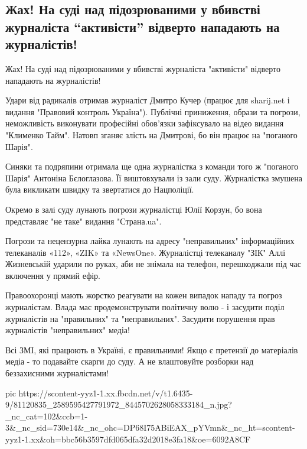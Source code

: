  
 
 
 
 
\subsection{Жах! На суді над підозрюваними у вбивстві журналіста  \enquote{активісти} відверто нападають на журналістів! }
\label{sec:24_12_2019.fb.tomilenko_sergij.1.aktivist_napadenie_sud}

Жах! На суді над підозрюваними у вбивстві журналіста  "активісти" відверто нападають на журналістів! 

Удари від радикалів отримав журналіст Дмитро Кучер (працює для sharij.net і
видання "Правовий контроль Україна"). Публічні приниження, образи та погрози,
неможливість виконувати професійні обов'язки зафіксувало на відео  видання
"Клименко Тайм". Натовп зганяє злість на Дмитрові, бо він працює на "поганого
Шарія".

Синяки та подряпини отримала ще одна журналістка з команди того ж "поганого
Шарія" Антоніна Бєлоглазова. Її виштовхували із зали суду. Журналістка змушена
була викликати швидку та звертатися до Нацполіції.

Окремо в залі суду лунають погрози журналістці Юлії Корзун, бо вона представляє
"не таке" видання "Страна.ua".

Погрози та нецензурна лайка лунають на адресу "неправильних" інформаційних
телеканалів «112», «ZIK» та «NewsOne». Журналістці телеканалу "ЗІК" Аллі
Жизневській ударили по руках, аби не знімала на телефон, перешкоджали під час
включення у прямий ефір.

Правоохоронці мають жорстко реагувати на кожен випадок нападу та погроз
журналістам. Влада має продемонструвати політичну волю - і засудити поділ
журналістів на "правильних" та "неправильних". Засудити порушення прав
журналістів "неправильних" медіа!

Всі ЗМІ, які працюють в Україні, є правильними! Якщо є претензії до матеріалів
медіа - то подавайте скарги до суду. А не влаштовуйте розборки над беззахисними
журналістами!

\ifcmt
  pic https://scontent-yyz1-1.xx.fbcdn.net/v/t1.6435-9/81120835_2589595427791972_8445702628058333184_n.jpg?_nc_cat=102&ccb=1-3&_nc_sid=730e14&_nc_ohc=DP68I75ABiEAX_pYVmn&_nc_ht=scontent-yyz1-1.xx&oh=bbc56b3597dfd065dfa32d2018e3fa18&oe=6092A8CF
\fi

